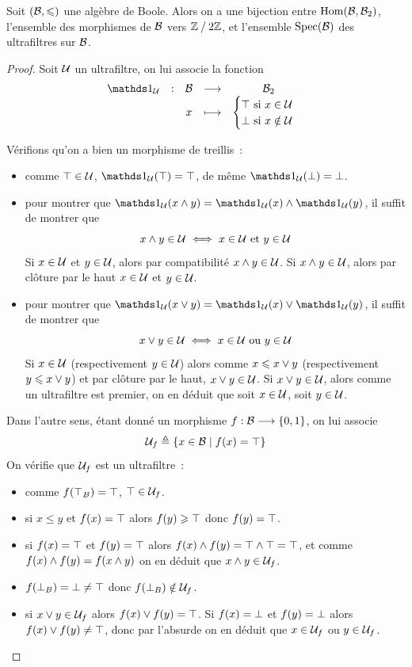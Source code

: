 \begin{proposition}
  Soit $(\mathcal{B},\leqslant)$ une algèbre de Boole. Alors on a une bijection
  entre $\operatorname{Hom}(\mathcal{B},\mathcal{B}_2)$, l'ensemble des morphismes de $\mathcal{B}$ vers
  $\mathord{\mathbb Z}\mathbin{/}\mathord{2\mathbb Z}$, et l'ensemble $\operatorname{Spec}(\mathcal{B})$ des ultrafiltres sur
  $\mathcal{B}$.
\end{proposition}

\begin{proof}
  Soit $\mathcal{U}$ un ultrafiltre, on lui associe la fonction
  \[
  \makeFun{\indicP{\varUlF}}{\varBB}{\varBB_2}{x}
          {\begin{cases}
              \opT \text{ si } x \in \varUlF \\
              \opB \text{ si } x \notin \varUlF
          \end{cases}}\]

  Vérifions qu'on a bien un morphisme de treillis~:
  \begin{itemize}
  \item comme $\top\in\mathcal{U}$, $\indicP{\varUlF}(\opT) = \opT$, de même
    $\indicP{\varUlF}(\opB) = \opB$.
  \item pour montrer que
    $\indicP{\varUlF}(x\opmt y) = \indicP{\varUlF}(x)\opmt\indicP{\varUlF}(y)$,
    il suffit de montrer que
    \[x\wedge y \in \mathcal{U} \iff x\in\mathcal{U} \text{ et }y\in\mathcal{U}\]
    Si $x\in \mathcal{U}$ et $y\in\mathcal{U}$, alors par compatibilité
    $x\wedge y \in \mathcal{U}$. Si $x\wedge y \in \mathcal{U}$, alors par clôture
    par le haut $x\in \mathcal{U}$ et $y\in \mathcal{U}$.
  \item pour montrer que
    $\indicP{\varUlF}(x\opjn y) = \indicP{\varUlF}(x)\opjn\indicP{\varUlF}(y)$,
    il suffit de montrer que
    \[x\vee y \in \mathcal{U} \iff x\in\mathcal{U} \text{ ou }y\in\mathcal{U}\]
    Si $x\in \mathcal{U}$ (respectivement $y\in \mathcal{U}$) alors comme
    $x\leqslant x\vee y$ (respectivement $y\leqslant x\vee y$) et par clôture par le
    haut,
    $x\vee y \in \mathcal{U}$. Si $x\vee y \in \mathcal{U}$, alors comme un
    ultrafiltre est premier, on en déduit que soit $x\in\mathcal{U}$, soit
    $y\in \mathcal{U}$.
  \end{itemize}

  Dans l'autre sens, étant donné un morphisme $f : \displaystyle \mathcal{B} \longrightarrow \{0,1\}$,
  on lui associe
  \[\mathcal{U}_f \triangleq \left\{ x\in \mathcal{B} \;\middle\vert\; f(x) = \top \right\}\]
  On vérifie que $\mathcal{U}_f$ est un ultrafiltre~:
  \begin{itemize}
  \item comme $f(\top_B) = \top$, $\top\in \mathcal{U}_f$.
  \item si $x\leq y$ et $f(x)=\top$ alors $f(y)\geqslant \top$ donc $f(y)=\top$.
  \item si $f(x) = \top$ et $f(y)=\top$ alors
    $f(x)\wedge f(y) = \top\wedge\top =\top$, et comme
    $f(x)\wedge f(y)=f(x\wedge y)$ on en déduit que $x\wedge y \in \mathcal{U}_f$.
  \item $f(\bot_B)=\bot\neq\top$ donc $f(\bot_B)\notin\mathcal{U}_f$.
  \item si $x\vee y \in \mathcal{U}_f$ alors $f(x)\vee f(y) = \top$. Si
    $f(x) = \bot$ et $f(y) = \bot$ alors $f(x)\vee f(y) \neq \top$, donc par
    l'absurde on en déduit que $x\in \mathcal{U}_f$ ou $y\in \mathcal{U}_f$.
  \end{itemize}


\end{proof}
